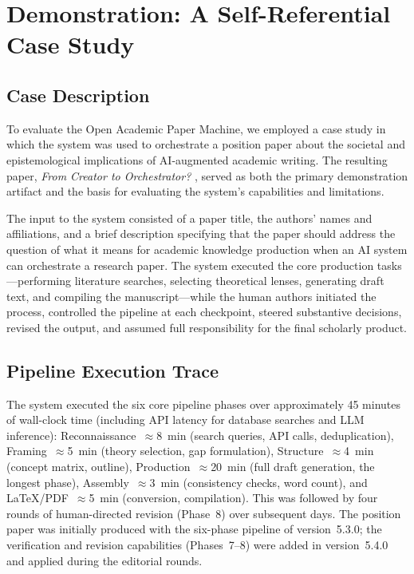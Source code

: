 \documentclass{article}
\begin{document}
\section{Demonstration: A Self-Referential Case Study}

\subsection{Case Description}

To evaluate the Open Academic Paper Machine, we employed a case study in which the system was used to orchestrate a position paper about the societal and epistemological implications of AI-augmented academic writing. The resulting paper, \emph{From Creator to Orchestrator?} \citep{blask2026creator}, served as both the primary demonstration artifact and the basis for evaluating the system's capabilities and limitations.

The input to the system consisted of a paper title, the authors' names and affiliations, and a brief description specifying that the paper should address the question of what it means for academic knowledge production when an AI system can orchestrate a research paper. The system executed the core production tasks---performing literature searches, selecting theoretical lenses, generating draft text, and compiling the manuscript---while the human authors initiated the process, controlled the pipeline at each checkpoint, steered substantive decisions, revised the output, and assumed full responsibility for the final scholarly product.

\subsection{Pipeline Execution Trace}

The system executed the six core pipeline phases over approximately 45 minutes of wall-clock time (including API latency for database searches and LLM inference): Reconnaissance~$\approx$8~min (search queries, API calls, deduplication), Framing~$\approx$5~min (theory selection, gap formulation), Structure~$\approx$4~min (concept matrix, outline), Production~$\approx$20~min (full draft generation, the longest phase), Assembly~$\approx$3~min (consistency checks, word count), and \LaTeX/PDF~$\approx$5~min (conversion, compilation). This was followed by four rounds of human-directed revision (Phase~8) over subsequent days. The position paper was initially produced with the six-phase pipeline of version~5.3.0; the verification and revision capabilities (Phases~7--8) were added in version~5.4.0 and applied during the editorial rounds.
\end{document}
